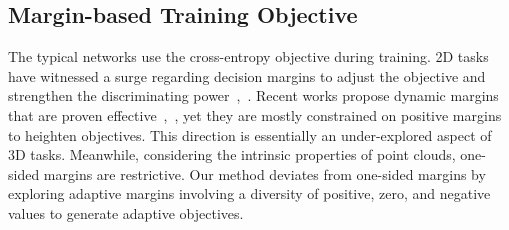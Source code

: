 \subsection{Margin-based Training Objective}

The typical networks use the cross-entropy objective during training. 2D tasks have witnessed a surge regarding decision margins to adjust the objective and strengthen the discriminating power~\cite{deng2019arcface},~\cite{wang2018cosface}. Recent works propose dynamic margins that are proven effective~\cite{li2022towards},~\cite{li2020boosting}, yet they are mostly constrained on positive margins to heighten objectives. This direction is essentially an under-explored aspect of 3D tasks. Meanwhile, considering the intrinsic properties of point clouds, one-sided margins are restrictive. Our method deviates from one-sided margins by exploring adaptive margins involving a diversity of positive, zero, and negative values to generate adaptive objectives.